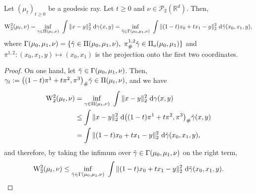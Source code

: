 \documentclass[10pt,a4paper]{amsart}
\newcommand{\W}{\mathrm{W}}
\begin{document}
\begin{lemma} \label{lemma:ot_geod}
    Let $(\mu_t)_{t\ge 0}$ be a geodesic ray. Let $t\ge 0$ and $\nu\in\mathcal{P}_2(\mathbb{R}^d)$. Then, 
    \begin{equation}
        \W_2^2(\mu_t,\nu) = \inf_{\gamma\in\Pi(\mu_t,\nu)}\ \int \|x-y\|_2^2\ \mathrm{d}\gamma(x,y) = \inf_{\Tilde{\gamma}\in \Gamma(\mu_0,\mu_1,\nu)}\ \int \|(1-t)x_0+tx_1 -y\|_2^2\ \mathrm{d}\Tilde{\gamma}(x_0,x_1,y),
    \end{equation}
    where $\Gamma(\mu_0,\mu_1,\nu) = \{\Tilde{\gamma}\in\Pi(\mu_0,\mu_1,\nu),\ \pi^{1,2}_\#\Tilde{\gamma}\in\Pi_o(\mu_0,\mu_1)\}$ and $\pi^{1,2}:(x_0,x_1,y)\mapsto (x_0,x_1)$ is the projection onto the first two coordinates.
\end{lemma}

\begin{proof}
    On one hand, let $\Tilde{\gamma}\in\Gamma(\mu_0,\mu_1,\nu)$. Then, $\gamma_t := \big((1-t)\pi^1 + t\pi^2, \pi^3\big)_\#\Tilde{\gamma}\in\Pi(\mu_t,\nu)$, and we have 
    \begin{equation}
        \begin{aligned}
            \W_2^2(\mu_t,\nu) &= \inf_{\gamma\in\Pi(\mu_t,\nu)}\ \int \|x-y\|_2^2\ \mathrm{d}\gamma(x,y) \\
            &\le \int \|x-y\|_2^2 \ \mathrm{d}\big((1-t)\pi^1 + t\pi^2, \pi^3\big)_\#\Tilde{\gamma}(x,y) \\
            &= \int \|(1-t) x_0 + tx_1 - y\|_2^2\ \mathrm{d}\Tilde{\gamma}(x_0,x_1,y),
        \end{aligned}
    \end{equation}
    and therefore, by taking the infimum over $\Tilde{\gamma}\in\Gamma(\mu_0,\mu_1,\nu)$ on the right term,
    \begin{equation}
        \W_2^2(\mu_t, \nu) \le \inf_{\Tilde{\gamma}\in \Gamma(\mu_0,\mu_1,\nu)}\ \int \|(1-t)x_0+tx_1 - y\|_2^2\ \mathrm{d}\Tilde{\gamma}(x_0,x_1,y).
    \end{equation}


\end{proof}
\end{document}
